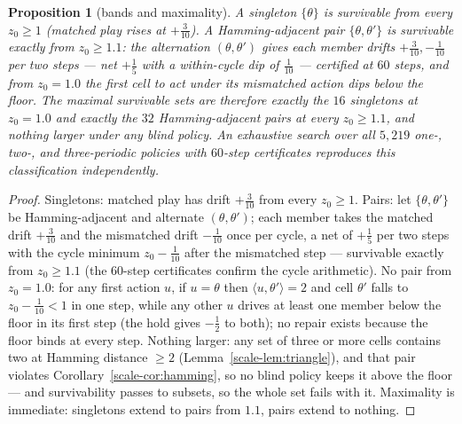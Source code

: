 \documentclass[10pt,twocolumn]{article}
\theoremstyle{plain}
\newtheorem{proposition}[theorem]{Proposition}
\theoremstyle{definition}
\theoremstyle{remark}
\begin{document}
\begin{proposition}[bands and maximality]\label{scale-prop:bands}
A singleton \(\{\theta\}\) is survivable from every \(z_{0} \ge 1\)
(matched play rises at \(+\tfrac3{10}\)). A Hamming-adjacent pair
\(\{\theta, \theta'\}\) is survivable exactly from
\(z_{0} \ge 1.1\): the alternation \((\theta, \theta')\) gives each
member drifts \(+\tfrac3{10}, -\tfrac1{10}\) per two steps --- net
\(+\tfrac15\) with a within-cycle dip of \(\tfrac1{10}\) --- certified
at \(60\) steps, and from \(z_{0} = 1.0\) the first cell to act under
its mismatched action dips below the floor. The maximal survivable
sets are therefore exactly the \(16\) singletons at \(z_{0} = 1.0\)
and exactly the \(32\) Hamming-adjacent pairs at every
\(z_{0} \ge 1.1\), and nothing larger under any blind policy. An
exhaustive search over all \(5{,}219\) one-, two-, and three-periodic
policies with \(60\)-step certificates reproduces this classification
independently.
\end{proposition}

\begin{proof}
Singletons: matched play has drift \(+\tfrac3{10}\) from every
\(z_{0} \ge 1\). Pairs: let \(\{\theta, \theta'\}\) be
Hamming-adjacent and alternate \((\theta, \theta')\); each member
takes the matched drift \(+\tfrac3{10}\) and the mismatched drift
\(-\tfrac1{10}\) once per cycle, a net of \(+\tfrac15\) per two
steps with the cycle minimum \(z_{0} - \tfrac1{10}\) after the
mismatched step --- survivable exactly from \(z_{0} \ge 1.1\)
(the \(60\)-step certificates confirm the cycle arithmetic).
No pair from \(z_{0} = 1.0\): for any first action \(u\), if
\(u = \theta\) then \(\langle u, \theta'\rangle = 2\) and cell
\(\theta'\) falls to \(z_{0} - \tfrac1{10} < 1\) in one step, while
any other \(u\) drives at least one member below the floor in its
first step (the hold gives \(-\tfrac12\) to both); no repair exists
because the floor binds at every step. Nothing larger: any set of
three or more cells contains two at Hamming distance \(\ge 2\)
(Lemma~\ref{scale-lem:triangle}), and that pair violates
Corollary~\ref{scale-cor:hamming}, so no blind policy keeps it above the
floor --- and survivability passes to subsets, so the whole set fails
with it. Maximality is immediate: singletons extend to pairs from
\(1.1\), pairs extend to nothing.
\end{proof}
\end{document}
